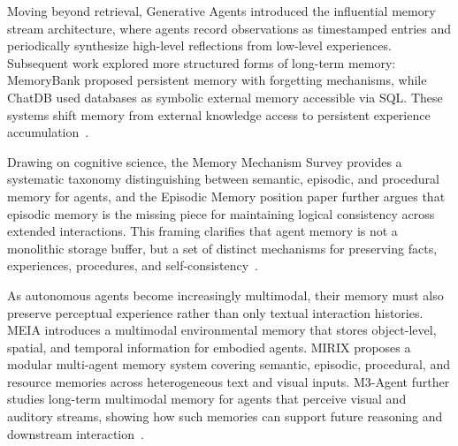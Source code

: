 Moving beyond retrieval, Generative Agents \cite{park2023generative} introduced the influential memory stream architecture, where agents record observations as timestamped entries and periodically synthesize high-level reflections from low-level experiences. Subsequent work explored more structured forms of long-term memory: MemoryBank \cite{zhong2024memorybank} proposed persistent memory with forgetting mechanisms, while ChatDB \cite{hu2023chatdb} used databases as symbolic external memory accessible via SQL. These systems shift memory from external knowledge access to persistent experience accumulation~\citep{deng2025swe,zhang2026swe,tian2026swe,rashid2025swe,badertdinov2026swe}.

Drawing on cognitive science, the Memory Mechanism Survey \cite{zhang2025survey} provides a systematic taxonomy distinguishing between semantic, episodic, and procedural memory for agents, and the Episodic Memory position paper \cite{pink2025position} further argues that episodic memory is the missing piece for maintaining logical consistency across extended interactions. This framing clarifies that agent memory is not a monolithic storage buffer, but a set of distinct mechanisms for preserving facts, experiences, procedures, and self-consistency~\citep{aleithan2024swe,yang2026swe,wang2025swe,sonwane2026omnicode,garg2025saving}.

As autonomous agents become increasingly multimodal, their memory must also preserve perceptual experience rather than only textual interaction histories. MEIA \cite{liu2024meia} introduces a multimodal environmental memory that stores object-level, spatial, and temporal information for embodied agents. MIRIX \cite{wang2025mirix} proposes a modular multi-agent memory system covering semantic, episodic, procedural, and resource memories across heterogeneous text and visual inputs. M3-Agent \cite{long2025seeing} further studies long-term multimodal memory for agents that perceive visual and auditory streams, showing how such memories can support future reasoning and downstream interaction~\citep{ma2025swe,he2025swe,peng2025swe,han2026swe,prathifkumar2025does}.

